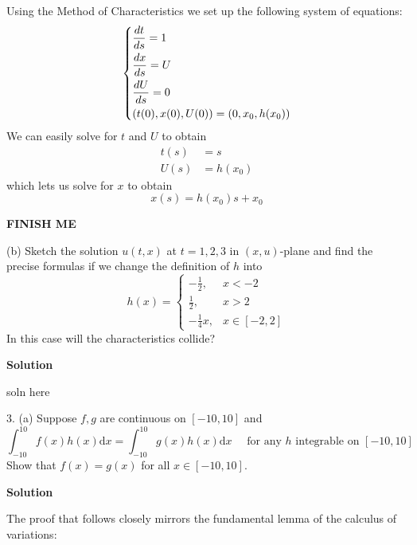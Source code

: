 \documentclass{article}
\begin{document}
Using the Method of Characteristics we set up the following system of
equations:
%
\begin{equation*}
    \begin{dcases}
        \frac{d t}{d s} = 1 \\
        \frac{d x}{d s} = U \\
        \frac{d U}{d s} = 0 \\
        \left( t(0), x(0), U(0)\right) = \left( 0, x_ 0, h(x_0) \right)
    \end{dcases}
\end{equation*}
%
We can easily solve for $t$ and $U$ to obtain
%
\begin{align*}
    t(s) &= s \\
    U(s) &= h(x_0)
\end{align*}
%
which lets us solve for $x$ to obtain
%
\begin{equation*}
    x(s) = h(x_0) s + x_0
\end{equation*}

\textbf{FINISH ME}

\vspace{5mm}

(b) Sketch the solution $u(t, x)$ at $t = 1, 2, 3$ in $(x, u)$-plane and
find the precise formulas if we change the definition of $h$ into
%
\begin{equation*}
    h(x) =
        \begin{cases}
            -\frac{1}{2}, & x < -2 \\
            \frac{1}{2}, & x > 2 \\
            -\frac{1}{4} x, & x \in [-2, 2]
        \end{cases}
\end{equation*}
%
In this case will the characteristics collide?

\textbf{Solution}

soln here

\newpage

3. (a) Suppose $f, g$ are continuous on $[-10, 10]$ and
%
\begin{equation*}
    \int_{-10}^{10} f(x) h(x) \mathrm{d} x = \int_{-10}^{10} g(x) h(x)\mathrm{d} x
    \quad \text { for any } h \text { integrable on } [-10, 10]
\end{equation*}
%
Show that $f(x) = g(x)$ for all $x \in [-10, 10]$.

\textbf{Solution}

The proof that follows closely mirrors the fundamental lemma of the
calculus of variations:
\end{document}
